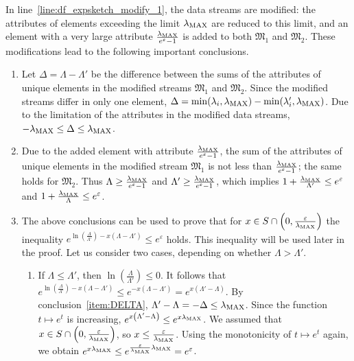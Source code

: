 In line~\ref{line:df_expsketch_modify_1}, the data streams are modified: the attributes of elements exceeding the limit $\lambda_{\mathrm{MAX}}$ are reduced to this limit, and an element with a very large attribute $\frac{\lambda_{\mathrm{MAX}}}{e^{\varepsilon} - 1}$ is added to both $\mathfrak{M}_1$ and $\mathfrak{M}_2$. These modifications lead to the following important conclusions.
\begin{enumerate}[label=\arabic*.]
  \item \label{item:DELTA} Let $\Delta = \Lambda - \Lambda'$ be the difference between the sums of the attributes of unique elements in the modified streams $\mathfrak{M}_1$ and $\mathfrak{M}_2$. Since the modified streams differ in only one element, $\Delta = \min(\lambda_i, \lambda_{\mathrm{MAX}}) - \min(\lambda'_i, \lambda_{\mathrm{MAX}})$. Due to the limitation of the attributes in the modified data streams, $-\lambda_{\mathrm{MAX}} \leq \Delta \leq \lambda_{\mathrm{MAX}}$.
  \item \label{item:DELTA2} Due to the added element with attribute $\frac{\lambda_{\mathrm{MAX}}}{e^{\varepsilon} - 1}$, the sum of the attributes of unique elements in the modified stream $\mathfrak{M}_1$ is not less than $\frac{\lambda_{\mathrm{MAX}}}{e^{\varepsilon} - 1}$; the same holds for $\mathfrak{M}_2$. Thus $\Lambda \geq \frac{\lambda_{\mathrm{MAX}}}{e^{\varepsilon} - 1}$ and $\Lambda' \geq \frac{\lambda_{\mathrm{MAX}}}{e^{\varepsilon} - 1}$, which implies $1 + \frac{\lambda_{\mathrm{MAX}}}{\Lambda'} \leq e^{\varepsilon}$ and $1 + \frac{\lambda_{\mathrm{MAX}}}{\Lambda} \leq e^{\varepsilon}$.
  \item The above conclusions can be used to prove that for $x \in S \cap \left(0, \frac{\varepsilon}{\lambda_{\mathrm{MAX}}}\right)$ the inequality $e^{\ln\left(\frac{\Lambda}{\Lambda'}\right) - x\left(\Lambda - \Lambda'\right)} \leq e^{\varepsilon}$ holds. This inequality will be used later in the proof. Let us consider two cases, depending on whether $\Lambda > \Lambda'$.
  \begin{enumerate}[label=(\alph*)]
    \item If $\Lambda \leq \Lambda'$, then $\ln\left(\frac{\Lambda}{\Lambda'}\right) \leq 0$. It follows that $e^{\ln\left(\frac{\Lambda}{\Lambda'}\right) - x\left(\Lambda - \Lambda'\right)} \leq e^{-x\left(\Lambda - \Lambda'\right)} = e^{x\left(\Lambda' - \Lambda\right)}$. By conclusion~\ref{item:DELTA}, $\Lambda' - \Lambda = -\Delta \leq \lambda_{\mathrm{MAX}}$. Since the function $t \mapsto e^t$ is increasing, $e^{x\left(\Lambda' - \Lambda\right)} \leq e^{x\lambda_{\mathrm{MAX}}}$. We assumed that $x \in S \cap \left(0, \frac{\varepsilon}{\lambda_{\mathrm{MAX}}}\right)$, so $x \leq \frac{\varepsilon}{\lambda_{\mathrm{MAX}}}$. Using the monotonicity of $t \mapsto e^t$ again, we obtain $e^{x\lambda_{\mathrm{MAX}}} \leq e^{\frac{\varepsilon}{\lambda_{\mathrm{MAX}}}\lambda_{\mathrm{MAX}}} = e^{\varepsilon}$.


\end{enumerate}
\end{enumerate}
